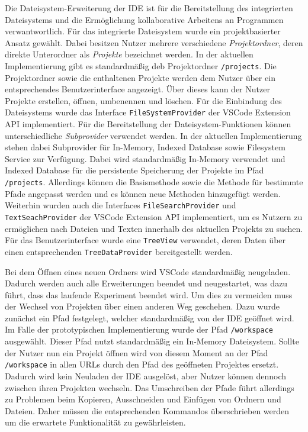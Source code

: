 Die Dateisystem-Erweiterung der IDE ist für die Bereitstellung des integrierten Dateisystems und die Ermöglichung kollaborative Arbeitens an Programmen verwantwortlich. Für das integrierte Dateisystem wurde ein projektbasierter Ansatz gewählt. Dabei besitzen Nutzer mehrere verschiedene \textit{Projektordner}, deren direkte Unterordner als \textit{Projekte} bezeichnet werden. In der aktuellen Implementierung gibt es standardmäßig deb Projektordner \texttt{/projects}. Die Projektordner sowie die enthaltenen Projekte werden dem Nutzer über ein entsprechendes Benutzerinterface angezeigt. Über dieses kann der Nutzer Projekte erstellen, öffnen, umbenennen und löschen. Für die Einbindung des Dateisystems wurde das Interface \texttt{FileSystemProvider} der VSCode Extension API implementiert. Für die Bereitstellung der Dateisystem-Funktionen können unterschiedliche \textit{Subprovider} verwendet werden. In der aktuellen Implementierung stehen dabei Subprovider für In-Memory, Indexed Database sowie Filesystem Service zur Verfügung. Dabei wird standardmäßig In-Memory verwendet und Indexed Database für die persistente Speicherung der Projekte im Pfad \texttt{/projects}. Allerdings können die Basismethode sowie die Methode für bestimmte Pfade angepasst werden und es können neue Methoden hinzugefügt werden. Weiterhin wurden auch die Interfaces \texttt{FileSearchProvider} und \texttt{TextSeachProvider} der VSCode Extension API implementiert, um es Nutzern zu ermöglichen nach Dateien und Texten innerhalb des aktuellen Projekts zu suchen. Für das Benutzerinterface wurde eine \texttt{TreeView} verwendet, deren Daten über einen entsprechenden \texttt{TreeDataProvider} bereitgestellt werden.

Bei dem Öffnen eines neuen Ordners wird VSCode standardmäßig neugeladen. Dadurch werden auch alle Erweiterungen beendet und neugestartet, was dazu führt, dass das laufende Experiment beendet wird. Um dies zu vermeiden muss der Wechsel von Projekten über einen anderen Weg geschehen. Dazu wurde zunächst ein Pfad festgelegt, welcher standardmäßig von der IDE geöffnet wird. Im Falle der prototypischen Implementierung wurde der Pfad \texttt{/workspace} ausgewählt. Dieser Pfad nutzt standardmäßig ein In-Memory Dateisystem. Sollte der Nutzer nun ein Projekt öffnen wird von diesem Moment an der Pfad \texttt{/workspace} in allen URLs durch den Pfad des geöffneten Projektes ersetzt. Dadurch wird kein Neuladen der IDE ausgelöst, aber Nutzer können dennoch zwischen ihren Projekten wechseln. Das Umschreiben der Pfade führt allerdings zu Problemen beim Kopieren, Ausschneiden und Einfügen von Ordnern und Dateien. Daher müssen die entsprechenden Kommandos überschrieben werden um die erwartete Funktionalität zu gewährleisten.

